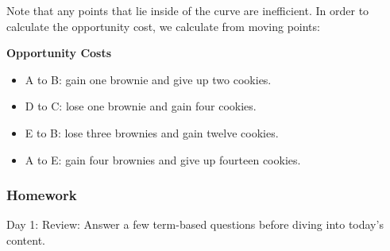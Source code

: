 \documentclass{scrreprt} %
\begin{document}
\begin{definition}
	Note that any points that lie inside of the curve are inefficient.
	In order to calculate the opportunity cost, we calculate from moving points:

	\textbf{Opportunity Costs}

	\begin{itemize}
		\item A to B: gain one brownie and give up two cookies.
		\item D to C: lose one brownie and gain four cookies.
		\item E to B: lose three brownies and gain twelve cookies.
		\item A to E: gain four brownies and give up fourteen cookies.
	\end{itemize}
\end{definition}

\subsubsection{Homework}

Day 1: Review: Answer a few term-based questions before diving into today’s content.
\end{document}
